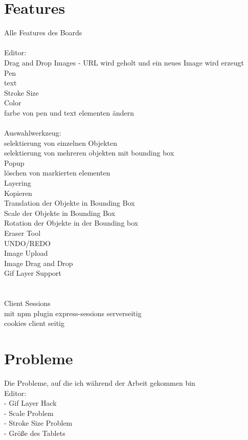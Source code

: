 \section{Features}\label{Features}
Alle Features des Boards\\
\\
Editor:\\
Drag and Drop Images - URL wird geholt und ein neues Image wird erzeugt\\
Pen\\
text\\
Stroke Size\\
Color\\
farbe von pen und text elementen ändern\\
\\
Auswahlwerkzeug:\\
selektierung von einzelnen Objekten\\
selektierung von mehreren objekten mit bounding box\\
Popup\\
löschen von markierten elementen\\
Layering\\
Kopieren\\
Translation der Objekte in Bounding Box\\
Scale der Objekte in Bounding Box\\
Rotation der Objekte in der Bounding box\\
Eraser Tool\\
UNDO/REDO\\
Image Upload\\
Image Drag and Drop\\
Gif Layer Support\\
\\
\\
Client Sessions\\
mit npm plugin express-sessions serverseitig\\
cookies client seitig


\section{Probleme}\label{Probleme}
Die Probleme, auf die ich während der Arbeit gekommen bin\\
Editor:\\
- Gif Layer Hack\\
- Scale Problem\\
- Stroke Size Problem\\
- Größe des Tablets